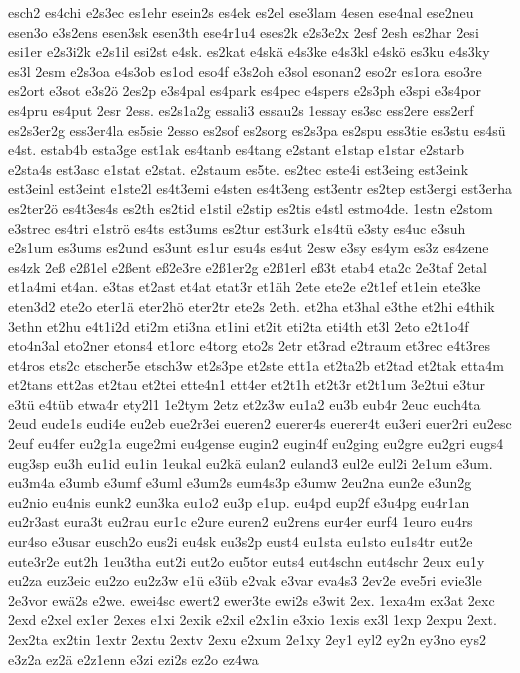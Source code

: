 {esch2
es4chi
e2s3ec
es1ehr
esein2s
es4ek
es2el
ese3lam
4esen
ese4nal
ese2neu
esen3o
e3s2ens
esen3sk
esen3th
ese4r1u4
eses2k
e2s3e2x
2esf
2esh
es2har
2esi
esi1er
e2s3i2k
e2s1il
esi2st
e4sk.
es2kat
e4skä
e4s3ke
e4s3kl
e4skö
es3ku
e4s3ky
es3l
2esm
e2s3oa
e4s3ob
es1od
eso4f
e3s2oh
e3sol
esonan2
eso2r
es1ora
eso3re
es2ort
e3sot
e3s2ö
2es2p
e3s4pal
es4park
es4pec
e4spers
e2s3ph
e3spi
e3s4por
es4pru
es4put
2esr
2ess.
es2s1a2g
essali3
essau2s
1essay
es3sc
ess2ere
ess2erf
es2s3er2g
ess3er4la
es5sie
2esso
es2sof
es2sorg
es2s3pa
es2spu
ess3tie
es3stu
es4sü
e4st.
estab4b
esta3ge
est1ak
es4tanb
es4tang
e2stant
e1stap
e1star
e2starb
e2sta4s
est3asc
e1stat
e2stat.
e2staum
es5te.
es2tec
este4i
est3eing
est3eink
est3einl
est3eint
e1ste2l
es4t3emi
e4sten
es4t3eng
est3entr
es2tep
est3ergi
est3erha
es2ter2ö
es4t3es4s
es2th
es2tid
e1stil
e2stip
es2tis
e4stl
estmo4de.
1estn
e2stom
e3strec
es4tri
e1strö
es4ts
est3ums
es2tur
est3urk
e1s4tü
e3sty
es4uc
e3suh
e2s1um
es3ums
es2und
es3unt
es1ur
esu4s
es4ut
2esw
e3sy
es4ym
es3z
es4zene
es4zk
2eß
e2ß1el
e2ßent
eß2e3re
e2ß1er2g
e2ß1erl
eß3t
etab4
eta2c
2e3taf
2etal
et1a4mi
et4an.
e3tas
et2ast
et4at
etat3r
et1äh
2ete
ete2e
e2t1ef
et1ein
ete3ke
eten3d2
ete2o
eter1ä
eter2hö
eter2tr
ete2s
2eth.
et2ha
et3hal
e3the
et2hi
e4thik
3ethn
et2hu
e4t1i2d
eti2m
eti3na
et1ini
et2it
eti2ta
eti4th
et3l
2eto
e2t1o4f
eto4n3al
eto2ner
etons4
et1orc
e4torg
eto2s
2etr
et3rad
e2traum
et3rec
e4t3res
et4ros
ets2c
etscher5e
etsch3w
et2s3pe
et2ste
ett1a
et2ta2b
et2tad
et2tak
etta4m
et2tans
ett2as
et2tau
et2tei
ette4n1
ett4er
et2t1h
et2t3r
et2t1um
3e2tui
e3tur
e3tü
e4tüb
etwa4r
ety2l1
1e2tym
2etz
et2z3w
eu1a2
eu3b
eub4r
2euc
euch4ta
2eud
eude1s
eudi4e
eu2eb
eue2r3ei
eueren2
euerer4s
euerer4t
eu3eri
euer2ri
eu2esc
2euf
eu4fer
eu2g1a
euge2mi
eu4gense
eugin2
eugin4f
eu2ging
eu2gre
eu2gri
eugs4
eug3sp
eu3h
eu1id
eu1in
1eukal
eu2kä
eulan2
euland3
eul2e
eul2i
2e1um
e3um.
eu3m4a
e3umb
e3umf
e3uml
e3um2s
eum4s3p
e3umw
2eu2na
eun2e
e3un2g
eu2nio
eu4nis
eunk2
eun3ka
eu1o2
eu3p
e1up.
eu4pd
eup2f
e3u4pg
eu4r1an
eu2r3ast
eura3t
eu2rau
eur1c
e2ure
euren2
eu2rens
eur4er
eurf4
1euro
eu4rs
eur4so
e3usar
eusch2o
eus2i
eu4sk
eu3s2p
eust4
eu1sta
eu1sto
eu1s4tr
eut2e
eute3r2e
eut2h
1eu3tha
eut2i
eut2o
eu5tor
euts4
eut4schn
eut4schr
2eux
eu1y
eu2za
euz3eic
eu2zo
eu2z3w
e1ü
e3üb
e2vak
e3var
eva4s3
2ev2e
eve5ri
evie3le
2e3vor
ewä2s
e2we.
ewei4sc
ewert2
ewer3te
ewi2s
e3wit
2ex.
1exa4m
ex3at
2exc
2exd
e2xel
ex1er
2exes
e1xi
2exik
e2xil
e2x1in
e3xio
1exis
ex3l
1exp
2expu
2ext.
2ex2ta
ex2tin
1extr
2extu
2extv
2exu
e2xum
2e1xy
2ey1
eyl2
ey2n
ey3no
eys2
e3z2a
ez2ä
e2z1enn
e3zi
ezi2s
ez2o
ez4wa
}
